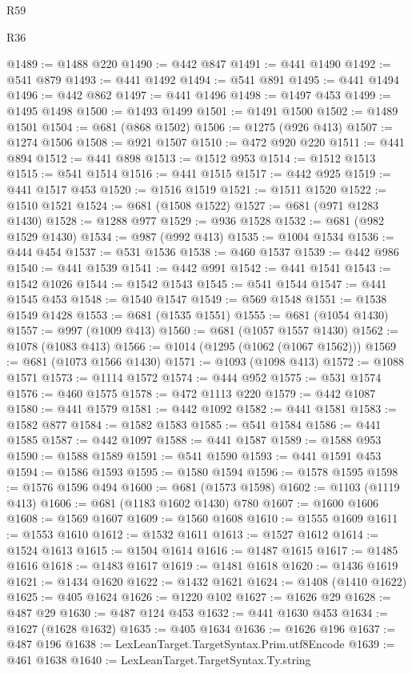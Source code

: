\begin{lexlean}{R59}
\begin{lexlean}{R36}
\begin{coremodule}
{{{{{{{{{{{{{{{{{{{{{{{{{{{{{{{{{{{{{{{{{{{{{{{{{{{{{{{{{{{{{{{{{{{{{{{{{{{{{{{{{{@1489 := @1488 @220
@1490 := @442 @847
@1491 := @441 @1490
@1492 := @541 @879
@1493 := @441 @1492
@1494 := @541 @891
@1495 := @441 @1494
@1496 := @442 @862
@1497 := @441 @1496
@1498 := @1497 @453
@1499 := @1495 @1498
@1500 := @1493 @1499
@1501 := @1491 @1500
@1502 := @1489 @1501
@1504 := @681 (@868 @1502)
@1506 := @1275 (@926 @413)
@1507 := @1274 @1506
@1508 := @921 @1507
@1510 := @472 @920 @220
@1511 := @441 @894
@1512 := @441 @898
@1513 := @1512 @953
@1514 := @1512 @1513
@1515 := @541 @1514
@1516 := @441 @1515
@1517 := @442 @925
@1519 := @441 @1517 @453
@1520 := @1516 @1519
@1521 := @1511 @1520
@1522 := @1510 @1521
@1524 := @681 (@1508 @1522)
@1527 := @681 (@971 @1283 @1430)
@1528 := @1288 @977
@1529 := @936 @1528
@1532 := @681 (@982 @1529 @1430)
@1534 := @987 (@992 @413)
@1535 := @1004 @1534
@1536 := @444 @454
@1537 := @531 @1536
@1538 := @460 @1537
@1539 := @442 @986
@1540 := @441 @1539
@1541 := @442 @991
@1542 := @441 @1541
@1543 := @1542 @1026
@1544 := @1542 @1543
@1545 := @541 @1544
@1547 := @441 @1545 @453
@1548 := @1540 @1547
@1549 := @569 @1548
@1551 := @1538 @1549 @1428
@1553 := @681 (@1535 @1551)
@1555 := @681 (@1054 @1430)
@1557 := @997 (@1009 @413)
@1560 := @681 (@1057 @1557 @1430)
@1562 := @1078 (@1083 @413)
@1566 := @1014 (@1295 (@1062 (@1067 @1562)))
@1569 := @681 (@1073 @1566 @1430)
@1571 := @1093 (@1098 @413)
@1572 := @1088 @1571
@1573 := @1114 @1572
@1574 := @444 @952
@1575 := @531 @1574
@1576 := @460 @1575
@1578 := @472 @1113 @220
@1579 := @442 @1087
@1580 := @441 @1579
@1581 := @442 @1092
@1582 := @441 @1581
@1583 := @1582 @877
@1584 := @1582 @1583
@1585 := @541 @1584
@1586 := @441 @1585
@1587 := @442 @1097
@1588 := @441 @1587
@1589 := @1588 @953
@1590 := @1588 @1589
@1591 := @541 @1590
@1593 := @441 @1591 @453
@1594 := @1586 @1593
@1595 := @1580 @1594
@1596 := @1578 @1595
@1598 := @1576 @1596 @494
@1600 := @681 (@1573 @1598)
@1602 := @1103 (@1119 @413)
@1606 := @681 (@1183 @1602 @1430) @780
@1607 := @1600 @1606
@1608 := @1569 @1607
@1609 := @1560 @1608
@1610 := @1555 @1609
@1611 := @1553 @1610
@1612 := @1532 @1611
@1613 := @1527 @1612
@1614 := @1524 @1613
@1615 := @1504 @1614
@1616 := @1487 @1615
@1617 := @1485 @1616
@1618 := @1483 @1617
@1619 := @1481 @1618
@1620 := @1436 @1619
@1621 := @1434 @1620
@1622 := @1432 @1621
@1624 := @1408 (@1410 @1622)
@1625 := @405 @1624
@1626 := @1220 @102
@1627 := @1626 @29
@1628 := @487 @29
@1630 := @487 @124 @453
@1632 := @441 @1630 @453
@1634 := @1627 (@1628 @1632)
@1635 := @405 @1634
@1636 := @1626 @196
@1637 := @487 @196
@1638 := LexLeanTarget.TargetSyntax.Prim.utf8Encode
@1639 := @461 @1638
@1640 := LexLeanTarget.TargetSyntax.Ty.string
}}}}}}}}}}}}}}}}}}}}}}}}}}}}}}}}}}}}}}}}}}}}}}}}}}}}}}}}}}}}}}}}}}}}}}}}}}}}}}}}}}
\end{coremodule}
\end{lexlean}
\end{lexlean}
